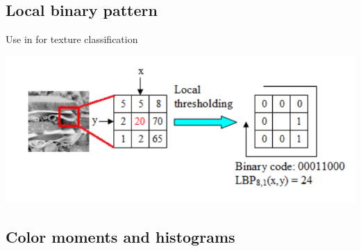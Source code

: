 \documentclass[aspectratio=169]{beamer}
\newenvironment{myframe}[1][t]{\begin{frame}[#1]{\secname}{\subsecname}}{\end{frame}}
\begin{document}
    \subsection{Local binary pattern}
    
    \begin{myframe}
        Use in \cite{Zong2010, Nguyen2014} for texture classification
        
        \begin{center}
            \includegraphics[scale=0.55]{../img/lbp}
        \end{center}
    \end{myframe}
    
    \subsection{Color moments and histograms}
    
\end{document}
